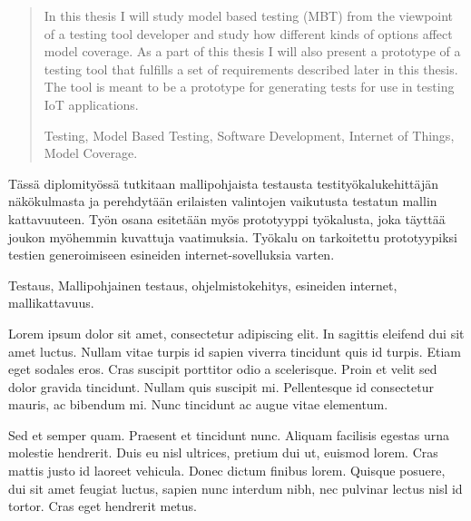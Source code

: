 \documentclass[a4paper, 12pt,titlepage]{dithesis}
\begin{document}

\begin{abstract}
In this thesis I will study model based testing (MBT) from the viewpoint of a testing tool developer and study how different kinds of options affect model coverage. As a part of this thesis I will also present a prototype of a testing tool that fulfills a set of requirements described later in this thesis. The tool is meant to be a prototype for generating tests for use in testing IoT applications.

\keywords Testing, Model Based Testing, Software Development, Internet of Things, Model Coverage.

\end{abstract}

\begin{tiivistelma}
Tässä diplomityössä tutkitaan mallipohjaista testausta testityökalukehittäjän näkökulmasta ja perehdytään erilaisten valintojen vaikutusta testatun mallin kattavuuteen. Työn osana esitetään myös prototyyppi työkalusta, joka täyttää joukon myöhemmin kuvattuja vaatimuksia. Työkalu on tarkoitettu prototyypiksi testien generoimiseen esineiden internet-sovelluksia varten.

\avainsanat Testaus, Mallipohjainen testaus, ohjelmistokehitys, esineiden internet, mallikattavuus.
\end{tiivistelma}


\sisluettelo

Lorem ipsum dolor sit amet, consectetur adipiscing elit. In sagittis eleifend dui sit amet luctus. Nullam vitae turpis id sapien viverra tincidunt quis id turpis. Etiam eget sodales eros. Cras suscipit porttitor odio a scelerisque. Proin et velit sed dolor gravida tincidunt. Nullam quis suscipit mi. Pellentesque id consectetur mauris, ac bibendum mi. Nunc tincidunt ac augue vitae elementum.

Sed et semper quam. Praesent et tincidunt nunc. Aliquam facilisis egestas urna molestie hendrerit. Duis eu nisl ultrices, pretium dui ut, euismod lorem. Cras mattis justo id laoreet vehicula. Donec dictum finibus lorem. Quisque posuere, dui sit amet feugiat luctus, sapien nunc interdum nibh, nec pulvinar lectus nisl id tortor. Cras eget hendrerit metus.

\end{document}

